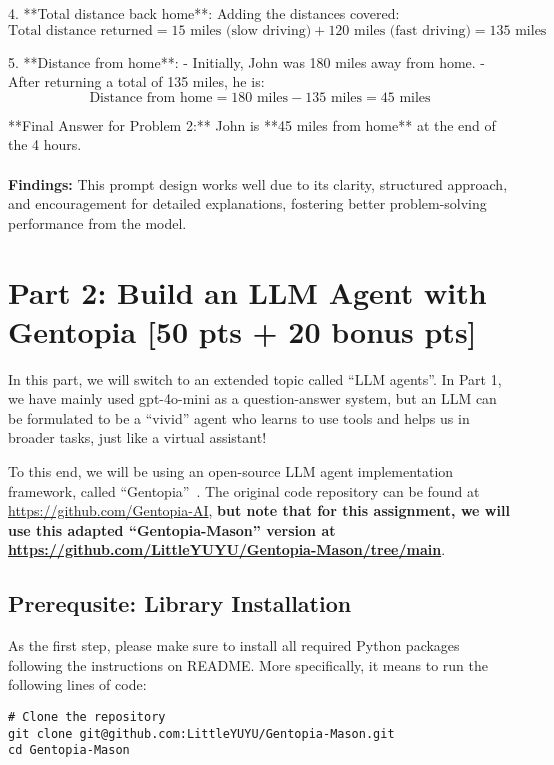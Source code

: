 \documentclass[11pt,addpoints,answers]{exam}
\begin{document}
\begin{questions}
\begin{tcolorbox}[fit,height=22cm, width=16cm, blank, borderline={1pt}{-2pt},nobeforeafter,breakable]
4. **Total distance back home**: Adding the distances covered:
   \[
   \text{Total distance returned} = 15 \text{ miles (slow driving)} + 120 \text{ miles (fast driving)} = 135 \text{ miles}
   \]

5. **Distance from home**: 
   - Initially, John was 180 miles away from home.
   - After returning a total of 135 miles, he is:
   \[
   \text{Distance from home} = 180 \text{ miles} - 135 \text{ miles} = 45 \text{ miles}
   \]

**Final Answer for Problem 2:**
John is **45 miles from home** at the end of the 4 hours.
    \\\\
    \textbf{Findings:} This prompt design works well due to its clarity, structured approach, and encouragement for detailed explanations, fostering better problem-solving performance from the model.
    \end{tcolorbox}
    
    

\clearpage\section*{Part 2: Build an LLM Agent with Gentopia [50 pts + 20 bonus pts]}

In this part, we will switch to an extended topic called ``LLM agents''. In Part 1, we have mainly used gpt-4o-mini as a question-answer system, but an LLM can be formulated to be a ``vivid'' agent who learns to use tools and helps us in broader tasks, just like a virtual assistant!

To this end, we will be using an open-source LLM agent implementation framework, called ``Gentopia''~\cite{xu2023gentopia}. The original code repository can be found at \url{https://github.com/Gentopia-AI}, \textbf{but note that for this assignment, we will use this adapted ``Gentopia-Mason'' version at \url{https://github.com/LittleYUYU/Gentopia-Mason/tree/main}}.


\bigskip
\subsection*{Prerequsite: Library Installation}
As the first step, please make sure to install all required Python packages following the instructions on README. More specifically, it means to run the following lines of code:
\begin{lstlisting}
# Clone the repository
git clone git@github.com:LittleYUYU/Gentopia-Mason.git
cd Gentopia-Mason


\end{lstlisting}
\end{questions}
\end{document}
